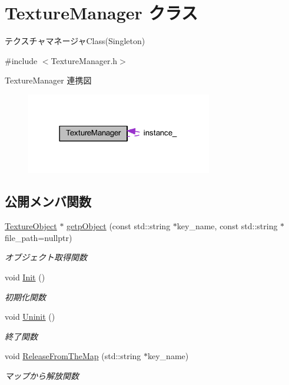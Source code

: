 \hypertarget{class_texture_manager}{}\section{Texture\+Manager クラス}
\label{class_texture_manager}


テクスチャマネージャ\+Class(\+Singleton)  




{\ttfamily \#include $<$Texture\+Manager.\+h$>$}



Texture\+Manager 連携図\nopagebreak
\begin{figure}[H]
\begin{center}
\leavevmode
\includegraphics[width=230pt]{class_texture_manager__coll__graph}
\end{center}
\end{figure}
\subsection*{公開メンバ関数}
\begin{DoxyCompactItemize}
\item 
\mbox{\hyperlink{class_texture_object}{Texture\+Object}} $\ast$ \mbox{\hyperlink{class_texture_manager_a8dc2cfb7e5d1a52b41401fed33342de0}{getp\+Object}} (const std\+::string $\ast$key\+\_\+name, const std\+::string $\ast$file\+\_\+path=nullptr)
\begin{DoxyCompactList}\small\item\em オブジェクト取得関数 \end{DoxyCompactList}\item 
void \mbox{\hyperlink{class_texture_manager_a7ebc403618f25c44a44c74cc04690502}{Init}} ()
\begin{DoxyCompactList}\small\item\em 初期化関数 \end{DoxyCompactList}\item 
void \mbox{\hyperlink{class_texture_manager_ab2ef3139e30856ee768b2e98ec5259f5}{Uninit}} ()
\begin{DoxyCompactList}\small\item\em 終了関数 \end{DoxyCompactList}\item 
void \mbox{\hyperlink{class_texture_manager_aa95379c1144d0cf1bbff438709ba72e8}{Release\+From\+The\+Map}} (std\+::string $\ast$key\+\_\+name)
\begin{DoxyCompactList}\small\item\em マップから解放関数 \end{DoxyCompactList}\end{DoxyCompactItemize}
